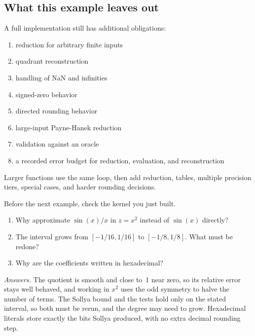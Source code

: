 \documentclass[manuscript, nonacm]{acmart}
\begin{document}
  \subsection{What this example leaves out}

  A full implementation still has additional obligations:

  \begin{enumerate}
    \item reduction for arbitrary finite inputs
    \item quadrant reconstruction
    \item handling of NaN and infinities
    \item signed-zero behavior
    \item directed rounding behavior
    \item large-input Payne-Hanek reduction
    \item validation against an oracle
    \item a recorded error budget for reduction, evaluation, and reconstruction
  \end{enumerate}

  Larger functions use the same loop, then add reduction, tables, multiple
  precision tiers, special cases, and harder rounding decisions.

  \begin{checkpoint}
    Before the next example, check the kernel you just built.
    \begin{enumerate}
      \item Why approximate $\sin(x)/x$ in $z = x^2$ instead of $\sin(x)$
      directly?
      \item The interval grows from $[-1/16, 1/16]$ to $[-1/8, 1/8]$. What
      must be redone?
      \item Why are the coefficients written in hexadecimal?
    \end{enumerate}
    \emph{Answers.}  The quotient is smooth and close to~1 near zero, so its
    relative error stays well behaved, and working in $x^2$ uses the odd
    symmetry to halve the number of terms. The Sollya bound and the tests
    hold only on the stated interval, so both must be rerun, and the degree
    may need to grow. Hexadecimal literals store exactly the bits Sollya
    produced, with no extra decimal rounding step.
  \end{checkpoint}

\end{document}
